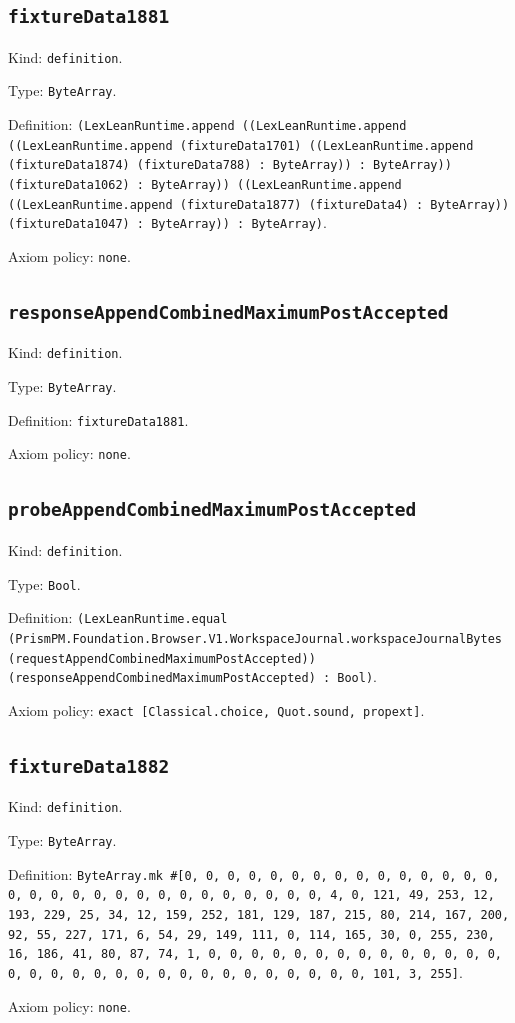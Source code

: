 \documentclass[11pt]{article}
\begin{document}
\subsection*{\texttt{fixtureData1881}}
\noindent Kind: \texttt{definition}.\par
\noindent Type: \texttt{ByteArray}.\par
\noindent Definition: \texttt{(LexLeanRuntime.append ((LexLeanRuntime.append ((LexLeanRuntime.append (fixtureData1701) ((LexLeanRuntime.append (fixtureData1874) (fixtureData788) : ByteArray)) : ByteArray)) (fixtureData1062) : ByteArray)) ((LexLeanRuntime.append ((LexLeanRuntime.append (fixtureData1877) (fixtureData4) : ByteArray)) (fixtureData1047) : ByteArray)) : ByteArray)}.\par
\noindent Axiom policy: \texttt{none}.\par
\subsection*{\texttt{responseAppendCombinedMaximumPostAccepted}}
\noindent Kind: \texttt{definition}.\par
\noindent Type: \texttt{ByteArray}.\par
\noindent Definition: \texttt{fixtureData1881}.\par
\noindent Axiom policy: \texttt{none}.\par
\subsection*{\texttt{probeAppendCombinedMaximumPostAccepted}}
\noindent Kind: \texttt{definition}.\par
\noindent Type: \texttt{Bool}.\par
\noindent Definition: \texttt{(LexLeanRuntime.equal (PrismPM.Foundation.Browser.V1.WorkspaceJournal.workspaceJournalBytes (requestAppendCombinedMaximumPostAccepted)) (responseAppendCombinedMaximumPostAccepted) : Bool)}.\par
\noindent Axiom policy: \texttt{exact [Classical.choice, Quot.sound, propext]}.\par
\subsection*{\texttt{fixtureData1882}}
\noindent Kind: \texttt{definition}.\par
\noindent Type: \texttt{ByteArray}.\par
\noindent Definition: \texttt{ByteArray.mk \#[0, 0, 0, 0, 0, 0, 0, 0, 0, 0, 0, 0, 0, 0, 0, 0, 0, 0, 0, 0, 0, 0, 0, 0, 0, 0, 0, 0, 0, 0, 4, 0, 121, 49, 253, 12, 193, 229, 25, 34, 12, 159, 252, 181, 129, 187, 215, 80, 214, 167, 200, 92, 55, 227, 171, 6, 54, 29, 149, 111, 0, 114, 165, 30, 0, 255, 230, 16, 186, 41, 80, 87, 74, 1, 0, 0, 0, 0, 0, 0, 0, 0, 0, 0, 0, 0, 0, 0, 0, 0, 0, 0, 0, 0, 0, 0, 0, 0, 0, 0, 0, 0, 0, 0, 0, 101, 3, 255]}.\par
\noindent Axiom policy: \texttt{none}.\par
\end{document}
